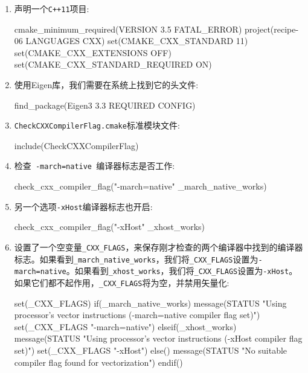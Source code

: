 \begin{enumerate}
\item 声明一个\texttt{C++11}项目:

\begin{codebox}[cmake]
cmake_minimum_required(VERSION 3.5 FATAL_ERROR)
project(recipe-06 LANGUAGES CXX)
set(CMAKE_CXX_STANDARD 11)
set(CMAKE_CXX_EXTENSIONS OFF)
set(CMAKE_CXX_STANDARD_REQUIRED ON)
\end{codebox}

\item 使用Eigen库，我们需要在系统上找到它的头文件:

\begin{codebox}[cmake]
find_package(Eigen3 3.3 REQUIRED CONFIG)
\end{codebox}

\item \texttt{CheckCXXCompilerFlag.cmake}标准模块文件:

\begin{codebox}[cmake]
include(CheckCXXCompilerFlag)
\end{codebox}

\item 检查\texttt{ -march=native }编译器标志是否工作:

\begin{codebox}[cmake]
check_cxx_compiler_flag("-march=native" _march_native_works)
\end{codebox}

\item 另一个选项\texttt{-xHost}编译器标志也开启:

\begin{codebox}[cmake]
check_cxx_compiler_flag("-xHost" _xhost_works)
\end{codebox}

\item 设置了一个空变量\texttt{\_CXX\_FLAGS}，来保存刚才检查的两个编译器中找到的编译器标志。如果看到\texttt{\_march\_native\_works}，我们将\texttt{\_CXX\_FLAGS}设置为\texttt{-march=native}。如果看到\texttt{\_xhost\_works}，我们将\texttt{\_CXX\_FLAGS}设置为\texttt{-xHost}。如果它们都不起作用，\texttt{\_CXX\_FLAGS}将为空，并禁用矢量化:

\begin{codebox}[cmake]
set(_CXX_FLAGS)
if(_march_native_works)
    message(STATUS "Using processor's vector instructions (-march=native compiler flag set)")
    set(_CXX_FLAGS "-march=native")
elseif(_xhost_works)
    message(STATUS "Using processor's vector instructions (-xHost compiler flag set)")
    set(_CXX_FLAGS "-xHost")
else()
    message(STATUS "No suitable compiler flag found for vectorization")
endif()
\end{codebox}


\end{enumerate}
